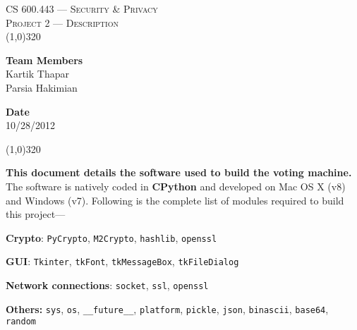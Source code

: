 \documentclass[a4paper, 10pt]{article}
\begin{document}
\begin{center}
	\textsc{\LARGE CS 600.443 --- Security \& Privacy}\\[0.5cm]
	\textsc{\Large Project 2 --- Description}\\[0.25cm]
	\line(1,0){320}\\[10pt]
\end{center}

\begin{minipage}{0.4\textwidth}
\begin{flushleft} \large
\textbf{Team Members}\\
Kartik Thapar\\
Parsia Hakimian
\end{flushleft}
\end{minipage}
\begin{minipage}{0.5\textwidth}
\begin{flushright} \large
\textbf{Date}\\
10/28/2012
\end{flushright}
\end{minipage}
\begin{center}
	\line(1,0){320}\\[15pt]
\end{center}



\textbf{This document details the software used to build the voting machine.}\\

The software is natively coded in \textbf{CPython} and developed on Mac OS X (v8) and Windows (v7). Following is the complete list of modules required to build this project---

\begin{itemize*}
	\item \textbf{Crypto}: \verb+PyCrypto+, \verb+M2Crypto+, \verb+hashlib+, \verb+openssl+
	\item \textbf{GUI}: \verb+Tkinter+, \verb+tkFont+, \verb+tkMessageBox+, \verb+tkFileDialog+
	\item \textbf{Network connections}: \verb+socket+, \verb+ssl+, \verb+openssl+
	\item \textbf{Others:} \verb+sys+, \verb+os+, \verb+__future__+, \verb+platform+, \verb+pickle+, \verb+json+, \verb+binascii+, \verb+base64+, \verb+random+
\end{itemize*}
\end{document}
